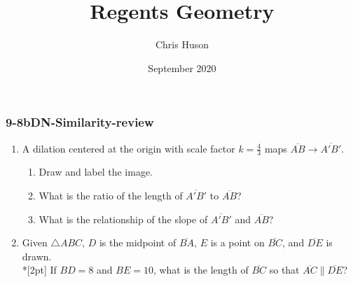 \documentclass[12pt, twoside]{article}
\title{Regents Geometry}
\author{Chris Huson}
\date{September 2020}
\begin{document}
\subsubsection*{9-8bDN-Similarity-review}
\begin{enumerate}
\item A dilation centered at the origin with scale factor $k=\frac{4}{3}$ maps $\overline{AB} \rightarrow \overline{A'B'}$. 
  \begin{multicols}{2}
    \begin{enumerate}
      \item Draw and label the image.
      \item What is the ratio of the length of $\overline{A'B'}$ to $\overline{AB}$?
      \item What is the relationship of the slope of $\overline{A'B'}$ and $\overline{AB}$?
      \begin{flushright}
      \end{flushright}
    \end{enumerate}
    \end{multicols} \vspace{1cm}
    
\item Given $\triangle ABC$, $D$ is the midpoint of $\overline{BA}$, $E$ is a point on $\overline{BC}$, and $\overline{DE}$ is drawn. \\*[2pt] 
    If $BD=8$ and $BE=10$, what is the length of $\overline{BC}$ so that $\overline{AC} \parallel \overline{DE}$?
    \begin{flushright}
      \end{flushright}


\end{enumerate}
\end{document}
